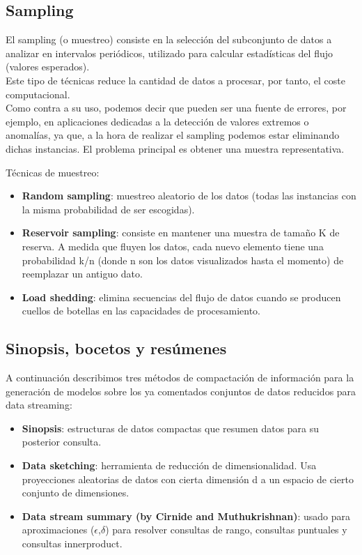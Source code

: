 \subsection{Sampling}

El sampling (o muestreo) consiste en la selección del subconjunto de datos a analizar en intervalos periódicos, utilizado para calcular estadísticas del flujo (valores esperados).\\
Este tipo de técnicas reduce la cantidad de datos a procesar, por tanto, el coste computacional.\\
Como contra a su uso, podemos decir que pueden ser una fuente de errores, por ejemplo, en aplicaciones dedicadas a la detección de valores extremos o anomalías, ya que, a la hora de realizar el sampling podemos estar eliminando dichas instancias. El problema principal es obtener una muestra representativa.


Técnicas de muestreo:
\begin{itemize}
	\item \textbf{Random sampling}: muestreo aleatorio de los datos (todas las instancias con la misma probabilidad de ser escogidas).
	\item \textbf{Reservoir sampling}: consiste en mantener una muestra de tamaño K de reserva. A medida que fluyen los datos, cada nuevo elemento tiene una probabilidad k/n (donde n son los datos visualizados hasta el momento) de reemplazar un antiguo dato.
	\item \textbf{Load shedding}: elimina secuencias del flujo de datos cuando se producen cuellos de botellas en las capacidades de procesamiento.
\end{itemize}

\subsection{Sinopsis, bocetos y resúmenes}
A continuación describimos tres métodos de compactación de información para la generación de modelos sobre los ya comentados conjuntos de datos reducidos para data streaming:

\begin{itemize}
	\item \textbf{Sinopsis}: estructuras de datos compactas que resumen datos para su posterior consulta.
	\item \textbf{Data sketching}: herramienta de reducción de dimensionalidad. Usa proyecciones aleatorias de datos con cierta dimensión d a un espacio de cierto conjunto de dimensiones.
	\item \textbf{Data stream summary (by Cirnide and Muthukrishnan)}: usado para aproximaciones ($\epsilon$,$\delta$) para resolver consultas de rango, consultas puntuales y consultas innerproduct.
\end{itemize}



